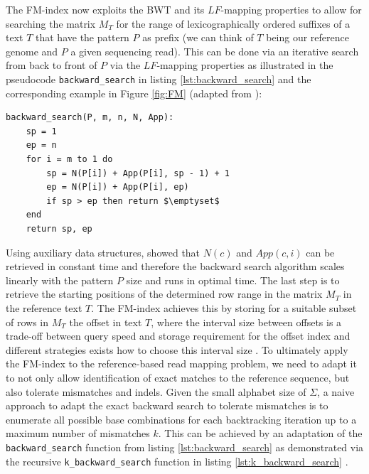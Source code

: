 The FM-index now exploits the BWT and its $LF$-mapping properties to allow for searching the matrix $M_T$ for the range of lexicographically ordered suffixes of a text $T$ that have the pattern $P$ as prefix (we can think of $T$ being our reference genome and $P$ a given sequencing read). This can be done via an iterative search from back to front of $P$ via the $LF$-mapping properties as illustrated in the pseudocode \texttt{backward\_search} in listing \ref{lst:backward_search} and the corresponding example in Figure \ref{fig:FM} (adapted from \citeauthor{Canzar2015} \citep{Canzar2015}):

\begin{lstlisting}[caption={A pseudocode implementation of a \texttt{backward\_search} of pattern $P$ through the BWT $T^{BWT}$ of text $T$ using the $LF$-mapping property.},captionpos=b, label={lst:backward_search}]
backward_search(P, m, n, N, App):
	sp = 1
	ep = n
	for i = m to 1 do
		sp = N(P[i]) + App(P[i], sp - 1) + 1
		ep = N(P[i]) + App(P[i], ep)
		if sp > ep then return $\emptyset$
	end	
	return sp, ep
\end{lstlisting}

Using auxiliary data structures, \citeauthor{Ferragina2005IndexingText} showed that $N(c)$ and $App(c, i)$ can be retrieved in constant time and therefore the backward search algorithm scales linearly with the pattern $P$ size and runs in optimal time. The last step is to retrieve the starting positions of the determined row range in the matrix $M_T$ in the reference text $T$. The FM-index achieves this by storing for a suitable subset of rows in $M_T$ the offset in text $T$, where the interval size between offsets is a trade-off between query speed and storage requirement for the offset index and different strategies exists how to choose this interval size \citep{Canzar2015}. To ultimately apply the FM-index to the reference-based read mapping problem, we need to adapt it to not only allow identification of exact matches to the reference sequence, but also tolerate mismatches and indels. Given the small alphabet size of $\Sigma$, a naive approach to adapt the exact backward search to tolerate mismatches is to enumerate all possible base combinations for each backtracking iteration up to a maximum number of mismatches $k$. This can be achieved by an adaptation of the \texttt{backward\_search} function from listing \ref{lst:backward_search} as demonstrated via the recursive \texttt{k\_backward\_search} function in listing \ref{lst:k_backward_search} \citep{Canzar2015}.


